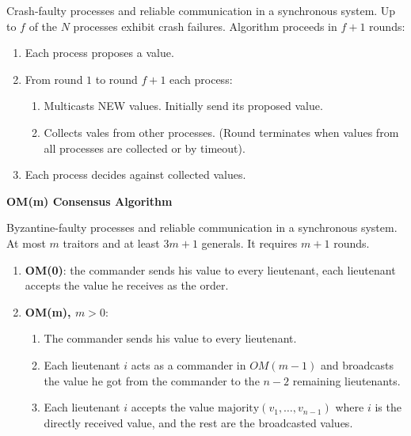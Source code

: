 \documentclass[a4paper, 10pt, twocolumn]{article}
\begin{document}
    Crash-faulty processes and reliable communication in a synchronous system.
    Up to $f$ of the $N$ processes exhibit crash failures.
    Algorithm proceeds in $f+1$ rounds:
    \begin{enumerate}
        \item Each process proposes a value.
        \item From round $1$ to round $f+1$ each process:
        \begin{enumerate}
            \item Multicasts NEW values. Initially send its proposed value.
            \item Collects vales from other processes. (Round terminates when values from all processes are collected or by timeout).
        \end{enumerate}
        \item Each process decides against collected values.
    \end{enumerate}

    \textbf{OM(m) Consensus Algorithm}

    Byzantine-faulty processes and reliable communication in a synchronous system.
    At most $m$ traitors and at least $3m + 1$ generals.
    It requires $m+1$ rounds.
    \begin{enumerate}
        \item \textbf{OM(0)}: the commander sends his value to every lieutenant, each lieutenant accepts the value he receives as the order.
        \item \textbf{OM(m), $m > 0$}:
        \begin{enumerate}
            \item The commander sends his value to every lieutenant.
            \item Each lieutenant $i$ acts as a commander in $OM(m-1)$ and broadcasts the value he got from the commander to the $n-2$ remaining lieutenants.
            \item Each lieutenant $i$ accepts the value $\text{majority}(v_1, \dots, v_{n-1})$ where $i$ is the directly received value, and the rest are the broadcasted values.
        \end{enumerate}
    \end{enumerate}
\end{document}
